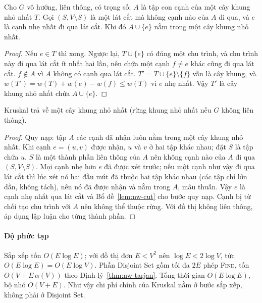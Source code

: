 \begin{lemma}\label{lem:nw-cut}
Cho $G$ vô hướng, liên thông, có trọng số; $A$ là tập con cạnh của một cây khung nhỏ nhất $T$. Gọi $(S, V\setminus S)$ là một lát cắt mà không cạnh nào của $A$ đi qua, và $e$ là cạnh nhẹ nhất đi qua lát cắt. Khi đó $A \cup \{e\}$ nằm trong một cây khung nhỏ nhất.
\end{lemma}

\begin{proof}
Nếu $e \in T$ thì xong. Ngược lại, $T \cup \{e\}$ có đúng một chu trình, và chu trình này đi qua lát cắt ít nhất hai lần, nên chứa một cạnh $f \ne e$ khác cũng đi qua lát cắt. $f \notin A$ vì $A$ không có cạnh qua lát cắt. $T' = T \cup \{e\} \setminus \{f\}$ vẫn là cây khung, và $w(T') = w(T) + w(e) - w(f) \le w(T)$ vì $e$ nhẹ nhất. Vậy $T'$ là cây khung nhỏ nhất chứa $A \cup \{e\}$.
\end{proof}

\begin{theorem}
Kruskal trả về một cây khung nhỏ nhất (rừng khung nhỏ nhất nếu $G$ không liên thông).
\end{theorem}

\begin{proof}
Quy nạp: tập $A$ các cạnh đã nhận luôn nằm trong một cây khung nhỏ nhất. Khi cạnh $e = (u,v)$ được nhận, $u$ và $v$ ở hai tập khác nhau; đặt $S$ là tập chứa $u$. $S$ là một thành phần liên thông của $A$ nên không cạnh nào của $A$ đi qua $(S, V \setminus S)$. Mọi cạnh nhẹ hơn $e$ đã được xét trước; nếu một cạnh như vậy đi qua lát cắt thì lúc xét nó hai đầu mút đã thuộc hai tập khác nhau (các tập chỉ lớn dần, không tách), nên nó đã được nhận và nằm trong $A$, mâu thuẫn. Vậy $e$ là cạnh nhẹ nhất qua lát cắt và Bổ đề~\ref{lem:nw-cut} cho bước quy nạp. Cạnh bị từ chối tạo chu trình với $A$ nên không thể thuộc rừng. Với đồ thị không liên thông, áp dụng lập luận cho từng thành phần.
\end{proof}

\paragraph*{Độ phức tạp} Sắp xếp tốn $O(E\log E)$; với đồ thị đơn $E < V^2$ nên $\log E < 2\log V$, tức $O(E\log E) = O(E\log V)$. Phần Disjoint Set gồm tối đa $2E$ phép \textsc{Find}, tốn $O(V + E\,\alpha(V))$ theo Định lý~\ref{thm:nw-tarjan}. Tổng thời gian $O(E\log E)$, bộ nhớ $O(V + E)$. Như vậy chi phí chính của Kruskal nằm ở bước sắp xếp, không phải ở Disjoint Set.

